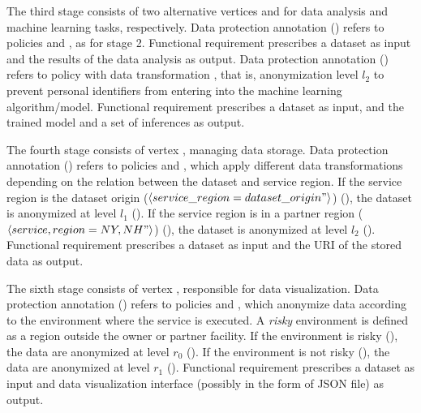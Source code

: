 The third stage consists of two alternative vertices  and  for data analysis and machine learning tasks, respectively.
Data protection annotation \myLambda() refers to policies  and , as for stage 2.
Functional requirement  prescribes a dataset as input and the results of the data analysis as output.
Data protection annotation \myLambda() refers to policy  with data transformation , that is, anonymization level $l_2$ to prevent personal identifiers from entering into the machine learning algorithm/model.
Functional requirement  prescribes a dataset as input, and the trained model and a set of inferences as output.

The fourth stage consists of vertex , managing data storage. Data protection annotation \myLambda() refers to policies  and , which apply different data transformations depending on the relation between the dataset and service region. If the service region is the dataset origin ($\langle service\_region=dataset\_origin"\rangle$) (), the dataset is anonymized at level $l_1$ ().
If the service region is in a partner region ($\langle service,region={NY,NH}"\rangle$) (), the dataset is anonymized at level $l_2$ ().
Functional requirement  prescribes a dataset as input and the URI of the stored data as output.

The sixth stage consists of vertex , responsible for data visualization. Data protection annotation \myLambda() refers to policies  and , which anonymize data according to the environment where the service is executed.
A \emph{risky} environment is defined as a region outside the owner or partner facility.
If the environment is risky (), the data are anonymized at level $r_0$ ().
If the environment is not risky (), the data are anonymized at level $r_1$ ().
Functional requirement  prescribes a dataset as input and data visualization interface (possibly in the form of JSON file) as output.

